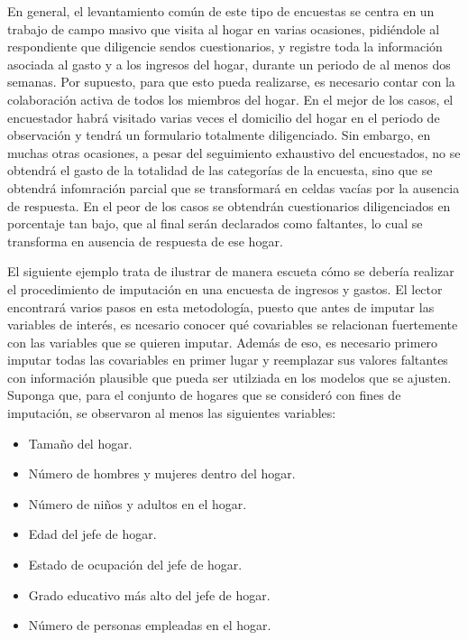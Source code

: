 \documentclass[
  12pt,
  spanish,
]{book}
\providecommand{\tightlist}{%
  \setlength{\itemsep}{0pt}\setlength{\parskip}{0pt}}
\begin{document}
En general, el levantamiento común de este tipo de encuestas se centra en un trabajo de campo masivo que visita al hogar en varias ocasiones, pidiéndole al respondiente que diligencie sendos cuestionarios, y registre toda la información asociada al gasto y a los ingresos del hogar, durante un periodo de al menos dos semanas. Por supuesto, para que esto pueda realizarse, es necesario contar con la colaboración activa de todos los miembros del hogar. En el mejor de los casos, el encuestador habrá visitado varias veces el domicilio del hogar en el periodo de observación y tendrá un formulario totalmente diligenciado. Sin embargo, en muchas otras ocasiones, a pesar del seguimiento exhaustivo del encuestados, no se obtendrá el gasto de la totalidad de las categorías de la encuesta, sino que se obtendrá infomración parcial que se transformará en celdas vacías por la ausencia de respuesta. En el peor de los casos se obtendrán cuestionarios diligenciados en porcentaje tan bajo, que al final serán declarados como faltantes, lo cual se transforma en ausencia de respuesta de ese hogar.

El siguiente ejemplo trata de ilustrar de manera escueta cómo se debería realizar el procedimiento de imputación en una encuesta de ingresos y gastos. El lector encontrará varios pasos en esta metodología, puesto que antes de imputar las variables de interés, es ncesario conocer qué covariables se relacionan fuertemente con las variables que se quieren imputar. Además de eso, es necesario primero imputar todas las covariables en primer lugar y reemplazar sus valores faltantes con información plausible que pueda ser utilziada en los modelos que se ajusten. Suponga que, para el conjunto de hogares que se consideró con fines de imputación, se observaron al menos las siguientes variables:

\begin{itemize}
\tightlist
\item
  Tamaño del hogar.
\item
  Número de hombres y mujeres dentro del hogar.
\item
  Número de niños y adultos en el hogar.
\item
  Edad del jefe de hogar.
\item
  Estado de ocupación del jefe de hogar.
\item
  Grado educativo más alto del jefe de hogar.
\item
  Número de personas empleadas en el hogar.
\end{itemize}
\end{document}
